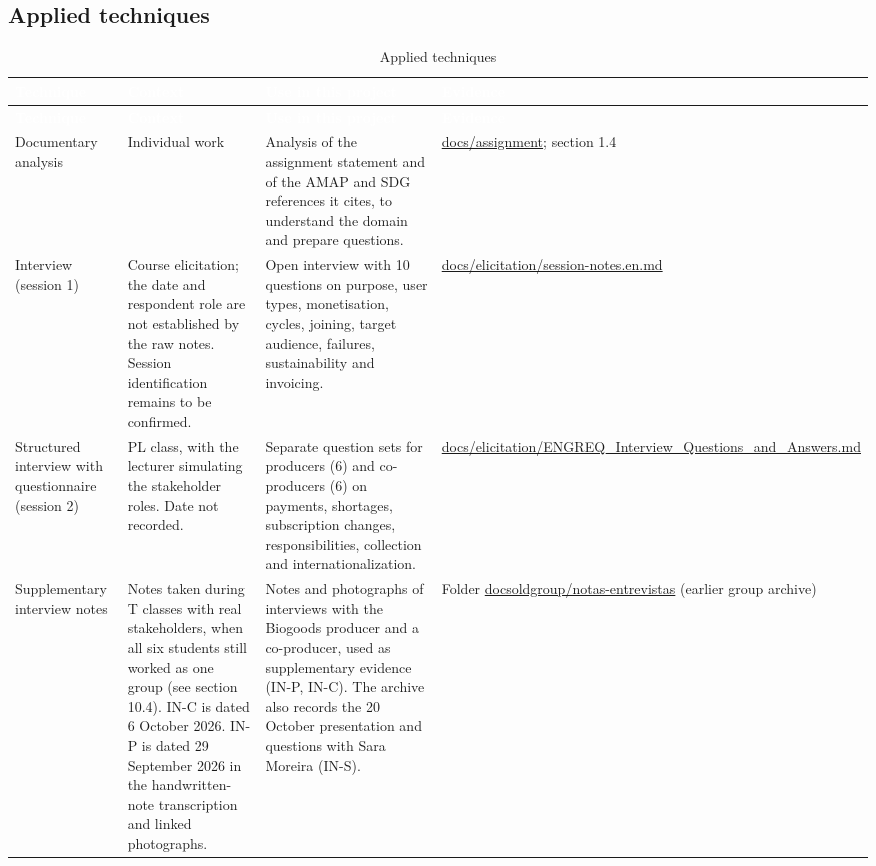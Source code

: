 \documentclass[11pt,a4paper]{article}
\begin{document}
\subsection{Applied techniques}

{\footnotesize
\begin{longtable}{>{\raggedright\arraybackslash\hspace{0pt}}p{}>{\raggedright\arraybackslash\hspace{0pt}}p{}>{\raggedright\arraybackslash\hspace{0pt}}p{}>{\raggedright\arraybackslash\hspace{0pt}}p{}}
\caption{Applied techniques}\\
\rowcolor{hdr}\textcolor{white}{\textbf{Technique}} & \textcolor{white}{\textbf{Context}} & \textcolor{white}{\textbf{Use in this project}} & \textcolor{white}{\textbf{Evidence}} \\ \endfirsthead
\rowcolor{hdr}\textcolor{white}{\textbf{Technique}} & \textcolor{white}{\textbf{Context}} & \textcolor{white}{\textbf{Use in this project}} & \textcolor{white}{\textbf{Evidence}} \\ \endhead
Documentary analysis & Individual work & Analysis of the assignment statement and of the AMAP and SDG references it cites, to understand the domain and prepare questions. & \url{docs/assignment}; section 1.4 \\ \hline
Interview (session 1) & Course elicitation; the date and respondent role are not established by the raw notes. Session identification remains to be confirmed. & Open interview with 10 questions on purpose, user types, monetisation, cycles, joining, target audience, failures, sustainability and invoicing. & \url{docs/elicitation/session-notes.en.md} \\ \hline
Structured interview with questionnaire (session 2) & PL class, with the lecturer simulating the stakeholder roles. Date not recorded. & Separate question sets for producers (6) and co-producers (6) on payments, shortages, subscription changes, responsibilities, collection and internationalization. & \url{docs/elicitation/ENGREQ_Interview_Questions_and_Answers.md} \\ \hline
Supplementary interview notes & Notes taken during T classes with real stakeholders, when all six students still worked as one group (see section 10.4). IN-C is dated 6 October 2026. IN-P is dated 29 September 2026 in the handwritten-note transcription and linked photographs. & Notes and photographs of interviews with the Biogoods producer and a co-producer, used as supplementary evidence (IN-P, IN-C). The archive also records the 20 October presentation and questions with Sara Moreira (IN-S). & Folder \url{docsoldgroup/notas-entrevistas} (earlier group archive) \\ \hline

\end{longtable}}
\end{document}

